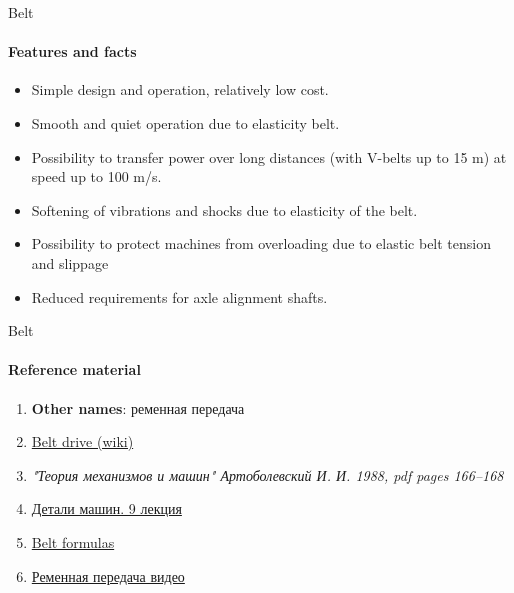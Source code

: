 \documentclass[aspectratio=169]{beamer}
\begin{document}
\begin{frame}[t]{Belt}
    \framesubtitle{Features and facts}
    \begin{itemize}
        \item Simple design and operation, relatively low cost. 
        \item Smooth and quiet operation due to elasticity belt. 
        \item Possibility to transfer power over long distances (with V-belts up to 15 m) at speed up to 100 m/s. 
        \item Softening of vibrations and shocks due to elasticity of the belt. 
        \item Possibility to protect machines from overloading due to elastic belt tension and slippage  
        \item Reduced requirements for axle alignment 
        shafts.
    \end{itemize}
\end{frame}

\begin{frame}[t]{Belt}
    \framesubtitle{Reference material}
    \begin{enumerate}
        \item \textbf{Other names}: ременная передача
        \item \href{https://en.m.wikipedia.org/wiki/Belt_(mechanical)}{Belt drive (wiki)}
        \item \textit{"Теория механизмов и машин" Артоболевский И. И. 1988, pdf pages 166--168 }
        \item \href{https://studfile.net/preview/2156455/}{Детали машин. 9 лекция}
        \item \href{https://youtu.be/CP_b7bzM9nQ}{Belt formulas}
        \item \href{https://youtu.be/Lr5E-WrTajs}{Ременная передача видео}
    \end{enumerate}
\end{frame}
\end{document}
